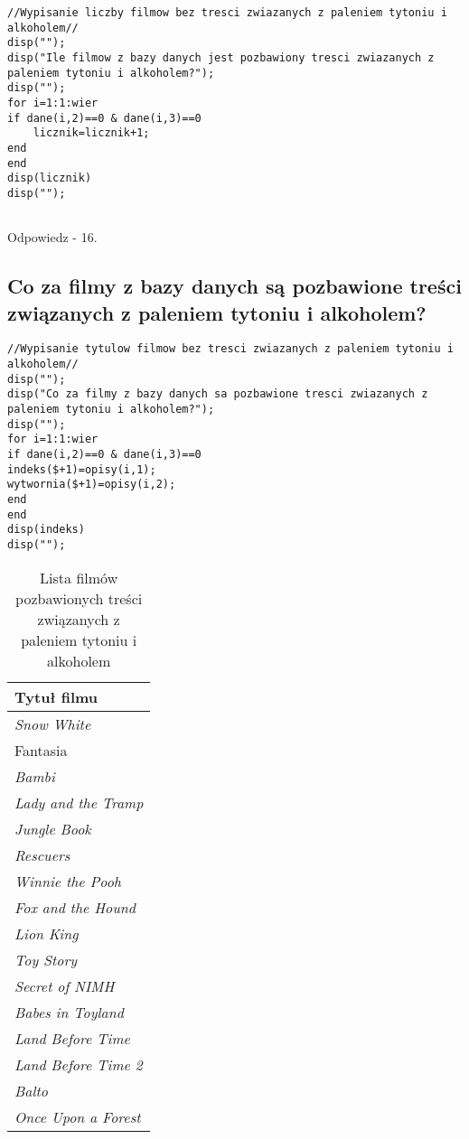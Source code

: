 \documentclass[a4paper, 11pt]{article}
\begin{document}
 \begin{lstlisting}      
//Wypisanie liczby filmow bez tresci zwiazanych z paleniem tytoniu i alkoholem//
disp("");
disp("Ile filmow z bazy danych jest pozbawiony tresci zwiazanych z paleniem tytoniu i alkoholem?");
disp("");
for i=1:1:wier
if dane(i,2)==0 & dane(i,3)==0
    licznik=licznik+1;
end
end
disp(licznik)
disp("");
      
      \end{lstlisting}
      Odpowiedz - 16.
\subsection{ Co za filmy z bazy danych są pozbawione treści związanych z paleniem  
      tytoniu i alkoholem?}
       \begin{lstlisting}
//Wypisanie tytulow filmow bez tresci zwiazanych z paleniem tytoniu i alkoholem//
disp("");
disp("Co za filmy z bazy danych sa pozbawione tresci zwiazanych z paleniem tytoniu i alkoholem?");
disp("");
for i=1:1:wier
if dane(i,2)==0 & dane(i,3)==0
indeks($+1)=opisy(i,1); 
wytwornia($+1)=opisy(i,2);   
end
end
disp(indeks)
disp("");       
       \end{lstlisting}
\begin{table}[H]
\centering
\caption{Lista filmów pozbawionych treści związanych z paleniem tytoniu i alkoholem}
\begin{tabular}{|l|}
\hline
\textbf{Tytuł filmu}        \\ \hline
\textit{Snow White}         \\
Fantasia                    \\
\textit{Bambi}              \\
\textit{Lady and the Tramp} \\
\textit{Jungle Book}        \\
\textit{Rescuers}           \\
\textit{Winnie the Pooh}    \\
\textit{Fox and the Hound}  \\
\textit{Lion King}          \\
\textit{Toy Story}          \\
\textit{Secret of NIMH}     \\
\textit{Babes in Toyland}   \\
\textit{Land Before Time}   \\
\textit{Land Before Time 2} \\
\textit{Balto}              \\
\textit{Once Upon a Forest} \\ \hline
\end{tabular}
\end{table}      
\end{document}
